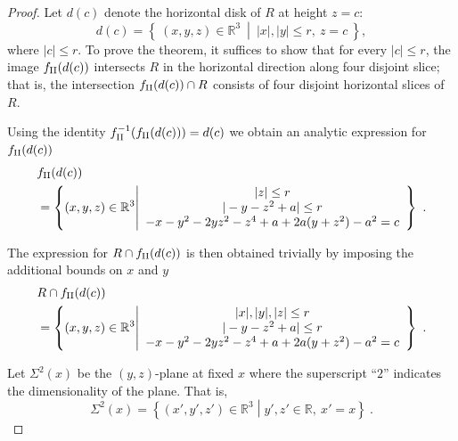 \documentclass[12pt]{iopart}
\begin{document}
\begin{proof}
Let $d(c)$ denote the horizontal disk of $R$ at height $z=c$:
\begin{equation}\label{eq:horizontal disk f II}
d(c) = \left\lbrace\ (x, y, z) \in \mathbb{R}^3\ \middle|\ |x|, |y| \leq r,\ z = c\ \right\rbrace,
\end{equation}
where $|c|\leq r$. To prove the theorem, it suffices to show that for every $|c|\leq r$, the image $f_{\rm II}(d(c))$ intersects $R$ in the horizontal direction along four disjoint slice; that is, the intersection $f_{\rm II}(d(c))\cap R$ consists of four disjoint horizontal slices of $R$. 

Using the identity $f^{-1}_{\rm II}(f_{\rm II}(d(c)))=d(c)$ we obtain an analytic expression for $f_{\rm II}(d(c))$
\begin{eqnarray}
&f_{\rm II}(d(c)) \nonumber \\ 
&=\left\lbrace (x,y,z)\in \mathbb{R}^3 \middle| \begin{array}{ccc}
|z| \leq r \\
|-y - z^2 + a| \leq r \\
-x - y^2 -2 y z^2 - z^4 + a + 2 a (y + z^2) - a^2 =c  \end{array} \right\rbrace\ . \nonumber \\
\label{eq:f II D} 
\end{eqnarray}

The expression for $R \cap f_{\rm II}(d(c))$ is then obtained trivially by imposing the additional bounds on $x$ and $y$
\begin{eqnarray}
&R\cap f_{\rm II}(d(c)) \nonumber \\ 
&=\left\lbrace (x,y,z)\in \mathbb{R}^3 \middle| \begin{array}{ccc}
|x|,|y|,|z| \leq r \\
|-y - z^2 + a| \leq r \\
-x - y^2 -2 y z^2 - z^4 + a + 2 a (y + z^2) - a^2 =c  \end{array} \right\rbrace\ . \nonumber \\
\label{eq:V intersect f II D} 
\end{eqnarray}

Let $\Sigma^2(x)$ be the $(y,z)$-plane at fixed $x$ where the superscript ``$2$'' indicates the dimensionality of the plane. That is,
\begin{equation}\label{eq: y z slice for f_II}
\Sigma^2(x) = \left\lbrace (x',y',z')\in\mathbb{R}^3 \middle| y',z'\in \mathbb{R},\ x'=x \right\rbrace\ .
\end{equation}



\end{proof}
\end{document}
